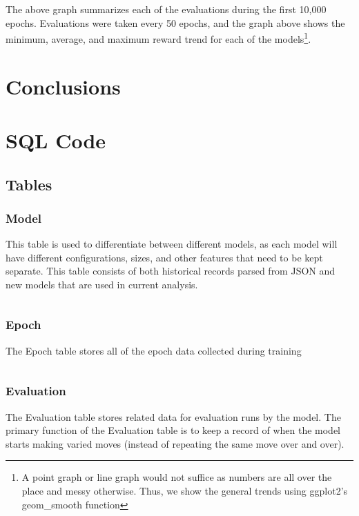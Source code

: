 \documentclass[12pt]{article}
\begin{document}
The above graph summarizes each of the evaluations during the first 10,000 epochs. Evaluations were taken every 50 epochs, and the graph above shows the minimum, average, and maximum reward trend for each of the models\footnote{A point graph or line graph would not suffice as numbers are all over the place and messy otherwise. Thus, we show the general trends using ggplot2's geom\_smooth function}.
\newpage

\section{Conclusions}


\newpage

\appendix

\section{SQL Code}

\subsection{Tables}

\subsubsection{Model}

This table is used to differentiate between different models, as each model will have different configurations, sizes, and other features that need to be kept separate. This table consists of both historical records parsed from JSON and new models that are used in current analysis.

\inputminted{SQL}{../../sql/tables/model.sql}

\subsubsection{Epoch}

The Epoch table stores all of the epoch data collected during training

\inputminted{SQL}{../../sql/tables/epoch.sql}

\subsubsection{Evaluation}

The Evaluation table stores related data for evaluation runs by the model. The primary function of the Evaluation table is to keep a record of when the model starts making varied moves (instead of repeating the same move over and over).
\end{document}
